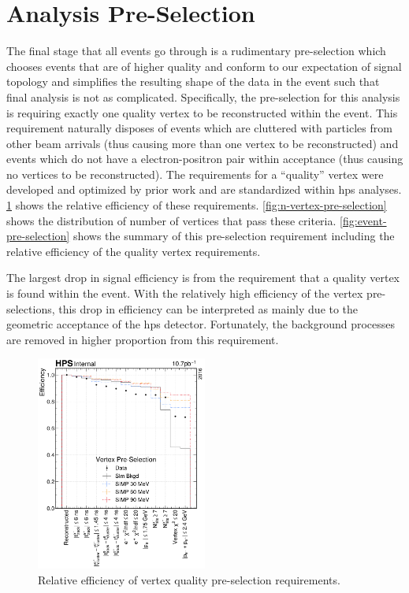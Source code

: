 \section{Analysis Pre-Selection}
The final stage that all events go through is a rudimentary pre-selection which chooses events
that are of higher quality and conform to our expectation of signal topology and simplifies the
resulting shape of the data in the event such that final analysis is not as complicated.
Specifically, the pre-selection for this analysis is requiring exactly one quality vertex to be
reconstructed within the event.
This requirement naturally disposes of events which are cluttered with particles from other beam arrivals
(thus causing more than one vertex to be reconstructed) and
events which do not have a electron-positron pair within acceptance (thus causing no vertices to be
reconstructed).
The requirements for a ``quality'' vertex were developed and optimized by 
prior work\cite{aspellman-thesis-2024} and are standardized within \ac{hps} analyses.
\cref{fig:vertex-pre-selection} shows the relative efficiency of these requirements.
\cref{fig:n-vertex-pre-selection} shows the distribution of number of vertices
that pass these criteria.
\cref{fig:event-pre-selection} shows the summary of this pre-selection requirement including the relative
efficiency of the quality vertex requirements.

The largest drop in signal efficiency is from the requirement that a quality vertex is found
within the event.
With the relatively high efficiency of the vertex pre-selections, this drop in efficiency
can be interpreted as mainly due to the geometric acceptance of the \ac{hps} detector.
Fortunately, the background processes are removed in higher proportion from this requirement.

\begin{figure}
  \centering
  \includegraphics[width=0.5\textwidth]{figures/hps/dataset/vertex-pre-selection-efficiency.pdf}
  \caption{Relative efficiency of vertex quality pre-selection requirements.}
  \label{fig:vertex-pre-selection}
\end{figure}

